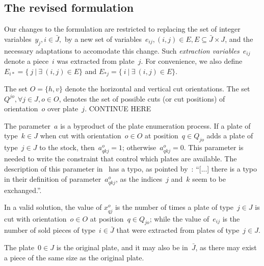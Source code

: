 \documentclass[runningheads]{llncs}
\begin{document}

\subsection{The revised formulation}

Our changes to the formulation are restricted to replacing the set of integer variables~\(y_j, i \in \bar{J},\) by a new set of variables~\(e_{ij}, (i, j) \in E, E \subseteq \bar{J} \times J\), and the necessary adaptations to accomodate this change.
Such \emph{extraction variables}~\(e_{ij}\) denote a piece~\(i\) was extracted from plate~\(j\).
For convenience, we also define \(E_{i*} = \{~j~|~\exists~(i, j) \in E \}\) and \(E_{*j} = \{~i~|~\exists~(i, j) \in E \}\).

The set \(O = \{h, v\}\) denote the horizontal and vertical cut orientations.
The set \(Q^{jo}, \forall j \in J, o \in O\), denotes the set of possible cuts (or cut positions) of orientation~\(o\) over plate~\(j\). CONTINUE HERE

The parameter~\(a\) is a byproduct of the plate enumeration process. If a plate of type~\(k \in J\) when cut with orientation~\(o \in O\) at position~\(q \in Q_{jo}\) adds a plate of type~\(j \in J\) to the stock, then~\(a^o_{qkj} = 1\); otherwise~\(a^o_{qkj} = 0\). This parameter is needed to write the constraint that control which plates are available. The description of this parameter in~\cite{furini:2016} has a typo, as pointed by~\cite{martin:2020}: ``[...] there is a typo in their definition of parameter~\(a^o_{qkj}\), as the indices~\(j\) and~\(k\) seem to be exchanged.''.

In a valid solution, the value of \(x^o_{qj}\) is the number of times a plate of type~\(j \in J\) is cut with orientation~\(o \in O\) at position~\(q \in Q_{jo}\); while the value of~\(e_{ij}\) is the number of sold pieces of type~\(i \in \bar{J}\) that were extracted from plates of type~\(j \in J\).

The plate~\(0 \in J\) is the original plate, and it may also be in~\(\bar{J}\), as there may exist a piece of the same size as the original plate.
\end{document}
